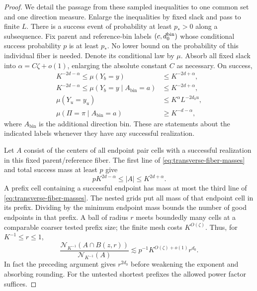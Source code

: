 \begin{proof}
We detail the passage from these sampled inequalities to one common
set and one direction measure.  Enlarge the inequalities by fixed
slack and pass to finite $L$.  There is a success event of probability
at least $p_*>0$ along a subsequence.  Fix parent and reference-bin
labels $(c,d_0^{\rm bin})$ whose conditional success probability
$p$ is at least $p_*$.  No lower bound on the probability of this
individual fiber is needed.  Denote its conditional law by $\mu$.
Absorb all fixed slack into $\alpha=C\zeta+o(1)$, enlarging the
absolute constant $C$ as necessary.  On success,
\begin{equation}\label{eq:transverse-fiber-masses}
 \begin{split}
 K^{-2d-\alpha}\le\mu(Y_b=y)&\le K^{-2d+\alpha},\\
 K^{-2d-\alpha}\le\mu(Y_b=y\mid A_{\mathrm{bin}}=a)
                                     &\le K^{-2d+\alpha},\\
 \mu(Y_u=y_u)&\le K^{\alpha}L^{-2d_0u},\\
 \mu(\Pi=\pi\mid A_{\mathrm{bin}}=a)&\ge K^{-d-\alpha},
 \end{split}
\end{equation}
where $A_{\mathrm{bin}}$ is the additional direction bin.  These
are statements about the indicated labels whenever they have any
successful realization.

Let $A$ consist of the centers of all endpoint pair cells with a
successful realization in this fixed parent/reference fiber.
The first line of \eqref{eq:transverse-fiber-masses} and total
success mass at least $p$ give
\begin{equation}\label{eq:transverse-common-set-size}
 pK^{2d-\alpha}\le |A|\le K^{2d+\alpha}.
\end{equation}
A prefix cell containing a successful endpoint has mass at most
the third line of \eqref{eq:transverse-fiber-masses}.  The nested
grids put all mass of that endpoint cell in its prefix.  Dividing
by the minimum endpoint mass bounds the number of good endpoints
in that prefix.  A ball of radius $r$ meets boundedly many cells
at a comparable coarser tested prefix size; the finite mesh costs
$K^{O(\zeta)}$.  Thus, for $K^{-1}\le r\le1$,
\begin{equation}\label{eq:transverse-common-set-counts}
 \frac{\mathcal N_{K^{-1}}(A\cap B(z,r))}
      {\mathcal N_{K^{-1}}(A)}
       \lesssim p^{-1}K^{O(\zeta)+o(1)}r^{d_0}.
\end{equation}
In fact the preceding argument gives $r^{2d_0}$ before weakening
the exponent and absorbing rounding.  For the untested shortest
prefixes the allowed power factor suffices.


\end{proof}
